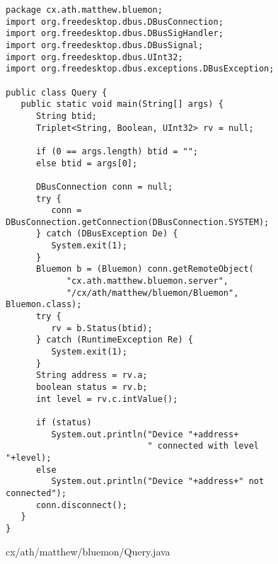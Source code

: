 \documentclass[a4paper,12pt]{article}
\begin{document}
\begin{figure}[!h]
\begin{center}
\begin{verbatim}
package cx.ath.matthew.bluemon;
import org.freedesktop.dbus.DBusConnection;
import org.freedesktop.dbus.DBusSigHandler;
import org.freedesktop.dbus.DBusSignal;
import org.freedesktop.dbus.UInt32;
import org.freedesktop.dbus.exceptions.DBusException;

public class Query {
   public static void main(String[] args) {
      String btid;
      Triplet<String, Boolean, UInt32> rv = null;
      
      if (0 == args.length) btid = "";
      else btid = args[0];
      
      DBusConnection conn = null;
      try {
         conn = DBusConnection.getConnection(DBusConnection.SYSTEM);
      } catch (DBusException De) {
         System.exit(1);
      }     
      Bluemon b = (Bluemon) conn.getRemoteObject(
            "cx.ath.matthew.bluemon.server", 
            "/cx/ath/matthew/bluemon/Bluemon", Bluemon.class);
      try {
         rv = b.Status(btid);
      } catch (RuntimeException Re) {
         System.exit(1);
      }
      String address = rv.a;
      boolean status = rv.b;
      int level = rv.c.intValue();

      if (status)
         System.out.println("Device "+address+
                            " connected with level "+level);
      else
         System.out.println("Device "+address+" not connected");
      conn.disconnect();
   }
}
\end{verbatim}
\end{center}
\caption{cx/ath/matthew/bluemon/Query.java}
\end{figure}

\newpage
\end{document}

